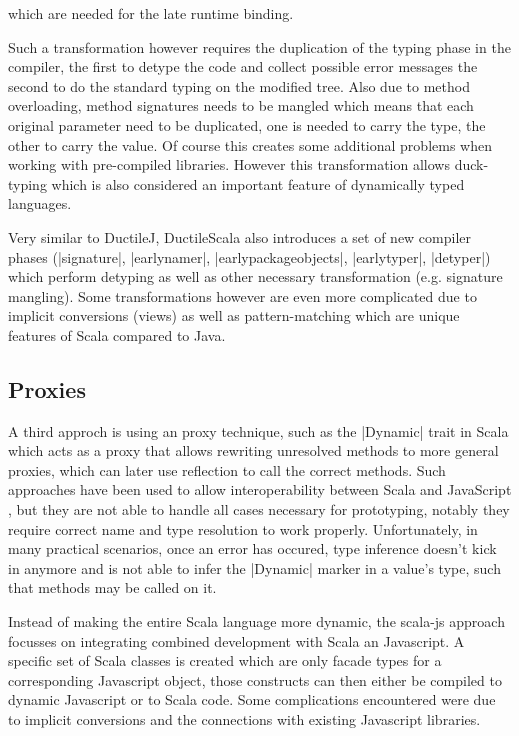 \noindent which are needed for the late runtime binding.

Such a transformation however requires the duplication of the typing phase in the compiler, the first to detype the code and collect possible error messages the second to do the standard typing on the modified tree. Also due to method overloading, method signatures needs to be mangled which means that each original parameter need to be duplicated, one is needed to carry the type, the other to carry the value. Of course this creates some additional problems when working with pre-compiled libraries. However this transformation allows duck-typing which is also considered an important feature of dynamically typed languages.

Very similar to DuctileJ, DuctileScala \cite{ductilescala} also introduces a set of new compiler phases (|signature|, |earlynamer|, |earlypackageobjects|, |earlytyper|, |detyper|) which perform detyping as well as other necessary transformation (e.g. signature mangling). Some transformations however are even more complicated due to implicit conversions (views) as well as pattern-matching which are unique features of Scala compared to Java.

\subsection{Proxies}

A third approch is using an proxy technique, such as the |Dynamic| trait in Scala \cite{dynamic} which acts as a proxy that allows rewriting unresolved methods to more general proxies, which can later use reflection to call the correct methods. Such approaches have been used to allow interoperability between Scala and JavaScript \cite{scala-js, greg-js-dsl}, but they are not able to handle all cases necessary for prototyping, notably they require correct name and type resolution to work properly. Unfortunately, in many practical scenarios, once an error has occured, type inference doesn't kick in anymore and is not able to infer the |Dynamic| marker in a value's type, such that methods may be called on it.


Instead of making the entire Scala language more dynamic, the scala-js approach \cite{scala-js} focusses on integrating combined development with Scala an Javascript. A specific set of Scala classes is created which are only facade types for a corresponding Javascript object, those constructs can then either be compiled to dynamic Javascript or to Scala code. Some complications encountered were due to implicit conversions and the connections with existing Javascript libraries.

